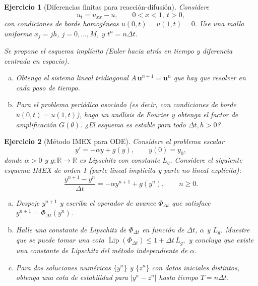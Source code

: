 \documentclass[12pt]{article}%
\def\R{\mathbb{R}}
\newtheorem{exercise}{Ejercicio}
\begin{document}
\begin{exercise}[Diferencias finitas para reacci\'on-difusi\'on]
Considere
\[
u_t=u_{xx}-u,\qquad 0<x<1,\ t>0,
\]
con condiciones de borde homog\'eneas $u(0,t)=u(1,t)=0$.
Use una malla uniforme $x_j=jh$, $j=0,\dots,M$, y $t^n=n\Delta t$.

Se propone el esquema impl\'icito (Euler hacia atr\'as en tiempo y diferencia
centrada en espacio).
\begin{enumerate}[(a)]
\item Obtenga el sistema lineal tridiagonal $A\,\mathbf u^{n+1}=\mathbf u^n$ que hay que resolver en cada paso de tiempo.
\item Para el problema peri\'odico asociado (es decir, con condiciones de borde $u(0,t)=u(1,t)$), haga un an\'alisis de Fourier y
obtenga el factor de amplificaci\'on $G(\theta)$. ¿El esquema es estable para todo $\Delta t,h>0$?
\end{enumerate}
\end{exercise}


\begin{exercise}[M\'etodo IMEX para ODE]
Considere el problema escalar
\[
y'=-\alpha y+g(y),\qquad y(0)=y_0,
\]
donde $\alpha>0$ y $g:\R\to\R$ es Lipschitz con constante $L_g$. Considere el siguiente esquema IMEX de orden 1 (parte lineal impl\'icita y parte no lineal expl\'icita):
\[
\frac{y^{n+1}-y^n}{\Delta t}=-\alpha y^{n+1}+g(y^n),\qquad n\ge 0.
\]

\begin{enumerate}[(a)]
\item Despeje $y^{n+1}$ y escriba el operador de avance $\Phi_{\Delta t}$ que satisface
$y^{n+1}=\Phi_{\Delta t}(y^n)$.
\item Halle una constante de Lipschitz de $\Phi_{\Delta t}$ en funci\'on de
$\Delta t$, $\alpha$ y $L_g$. Muestre que se puede tomar una cota
$\operatorname{Lip}(\Phi_{\Delta t})\le 1+\Delta t\,L_g,$ y concluya que existe una constante de Lipschitz del m\'etodo independiente de $\alpha$.
\item Para dos soluciones num\'ericas $\{y^n\}$ y $\{z^n\}$ con datos iniciales
distintos, obtenga una cota de estabilidad para $|y^n-z^n|$ hasta tiempo
$T=n\Delta t$.
\end{enumerate}

\end{exercise}
\end{document}
